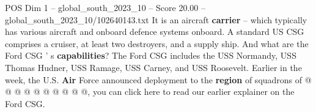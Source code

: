 \begin{textsample}{POS Dim 1 – global\_south\_2023\_10 – Score 20.00 – global\_south\_2023\_10/102640143.txt}
It is an aircraft \textbf{carrier} -- which typically has various aircraft and onboard defence systems onboard.
A standard US CSG comprises a cruiser, at least two destroyers, and a supply ship.
And what are the Ford CSG ' s \textbf{capabilities}?
The Ford CSG includes the USS Normandy, USS Thomas Hudner, USS Ramage, USS Carney, and USS Roosevelt.
Earlier in the week, the U.S. \textbf{Air} Force announced deployment to the \textbf{region} of squadrons of @ @ @ @ @ @ @ @ @ @, you can click here to read our earlier explainer on the Ford CSG.

\end{textsample}
